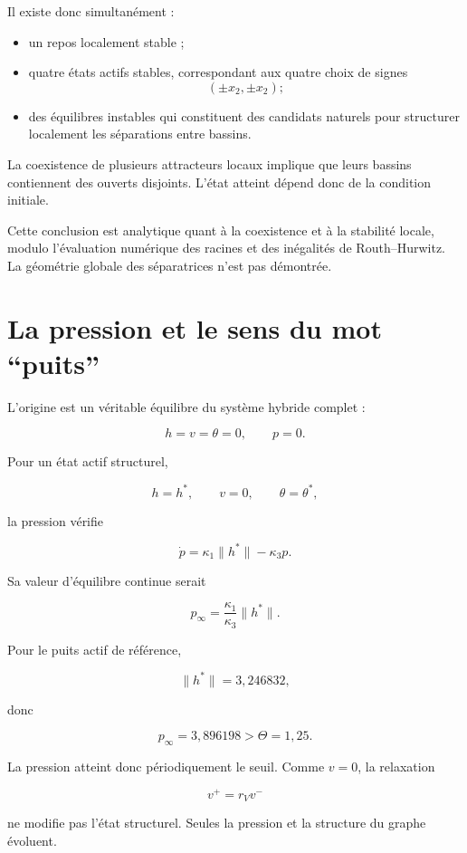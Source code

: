 Il existe donc simultanément :

\begin{itemize}
\item
  un repos localement stable ;
\item
  quatre états actifs stables, correspondant aux quatre choix de signes
  \[
  (\pm x_2,\pm x_2);
  \]
\item
  des équilibres instables qui constituent des candidats naturels pour structurer localement les séparations entre bassins.
\end{itemize}

La coexistence de plusieurs attracteurs locaux implique que leurs
bassins contiennent des ouverts disjoints. L'état atteint dépend donc
de la condition initiale.

Cette conclusion est analytique quant à la coexistence et à la
stabilité locale, modulo l'évaluation numérique des racines et des
inégalités de Routh--Hurwitz. La géométrie globale des séparatrices
n'est pas démontrée.

\section{La pression et le sens du mot ``puits''}
\label{annexe-reduction-pression-puits}

L'origine est un véritable équilibre du système hybride complet :

\[
h=v=\theta=0,
\qquad
p=0.
\]

Pour un état actif structurel,

\[
h=h^\ast,
\qquad
v=0,
\qquad
\theta=\theta^\ast,
\]

la pression vérifie

\[
\dot p
=
\kappa_1\|h^\ast\|
-
\kappa_3p.
\]

Sa valeur d'équilibre continue serait

\[
p_\infty
=
\frac{\kappa_1}{\kappa_3}
\|h^\ast\|.
\]

Pour le puits actif de référence,

\[
\|h^\ast\|
=
3{,}246832,
\]

donc

\[
p_\infty
=
3{,}896198
>
\Theta=1{,}25.
\]

La pression atteint donc périodiquement le seuil. Comme \(v=0\), la
relaxation

\[
v^+=r_Vv^-
\]

ne modifie pas l'état structurel. Seules la pression et la structure
du graphe évoluent.

